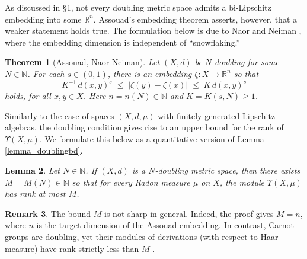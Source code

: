 \documentclass[reqno]{amsart}
\theoremstyle{plain}
\newtheorem{thm}{Theorem}[section]
\newtheorem{lemma}[thm]{Lemma}
\theoremstyle{definition}
\newtheorem{rmk}[thm]{Remark}
\theoremstyle{remark}
\numberwithin{equation}{section}
\newcommand{\N}{\mathbb{N}}
\newcommand{\R}{\mathbb{R}}
\newcommand{\U}{\Upsilon}
\begin{document}
As discussed in \S1, not every doubling metric space admits a bi-Lipschitz embedding into some $\R^n$. Assouad's embedding theorem \cite{Assouad} asserts, however, that a weaker statement holds true.  The formulation below is due to Naor and Neiman \cite{Naor:Neiman}, where the embedding dimension is independent of ``snowflaking.''

\begin{thm}[Assouad, Naor-Neiman] \label{thm_assouad}
Let $(X,d)$ be $N$-doubling for some $N \in \N$.  For each $s \in (0,1)$, there is an embedding $\zeta : X \to \R^n$ so that
$$
K^{-1}\,d(x,y)^s \;\leq\;
|\zeta(y) - \zeta(x)| \;\leq\;
K\,d(x,y)^s
$$
holds, for all $x,y \in X$.  Here $n = n(N) \in \N$ and $K = K(s,N) \geq 1$.
\end{thm}

Similarly to the case of spaces $(X,d,\mu)$ with finitely-generated Lipschitz algebras, the doubling condition gives rise to an upper bound for the rank of $\U(X,\mu)$.  We formulate this below as a quantitative version of Lemma \ref{lemma_doublingbd}.

\begin{lemma} \label{lemma_doublingbd2}
Let $N \in \N$.  If $(X,d)$ is a $N$-doubling metric space, then there exists $M = M(N) \in \N$ so that for every Radon measure $\mu$ on $X$, the module $\U(X,\mu)$ has rank at most $M$.
\end{lemma}

\begin{rmk}
The bound $M$ is not sharp in general.  Indeed, the proof gives $M = n$, where $n$ is the target dimension of the Assouad embedding. 
In contrast, Carnot groups are doubling, yet their modules of derivations (with respect to Haar measure) have rank strictly less than $M$ \cite[Thm 39]{WeaverED}.
\end{rmk}
\end{document}
